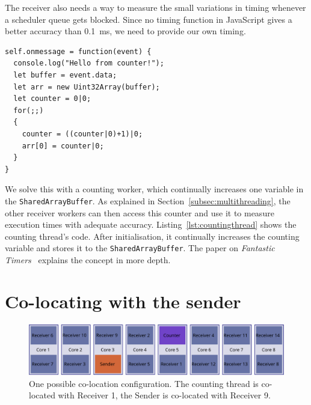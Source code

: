 \documentclass[11pt,
  titlepage=false,
  parskip=half,      %
]{scrreprt}
\begin{document}

The receiver also needs a way to measure the small variations in timing whenever a scheduler queue gets blocked.
Since no timing function in JavaScript gives a better accuracy than 0.1~ms, we need to provide our own timing.


\begin{lstlisting}[float,caption={The code for the counting thread},label={lst:countingthread}]
self.onmessage = function(event) {
  console.log("Hello from counter!");
  let buffer = event.data;
  let arr = new Uint32Array(buffer);
  let counter = 0|0;
  for(;;)
  {
    counter = ((counter|0)+1)|0;
    arr[0] = counter|0;
  }
}
\end{lstlisting}

We solve this with a counting worker, which continually increases one variable in the \texttt{SharedArrayBuffer}.
As explained in Section~\ref{subsec:multithreading}, the other receiver workers can then access this counter and use it to measure execution times with adequate accuracy.
Listing~\ref{lst:countingthread} shows the counting thread's code.
After initialisation, it continually increases the counting variable and stores it to the \texttt{SharedArrayBuffer}.
The paper on \textit{Fantastic Timers}~\cite{Schwarz2017Timers} explains the concept in more depth.

\section{Co-locating with the sender}
\label{sec:co-location}

\begin{figure}
\centering
\includegraphics[width=\textwidth]{figures/colocation}

\caption{One possible co-location configuration. The counting thread is co-located with Receiver 1, the Sender is co-located with Receiver 9.}
\label{fig:colocation}

\end{figure}
\end{document}
